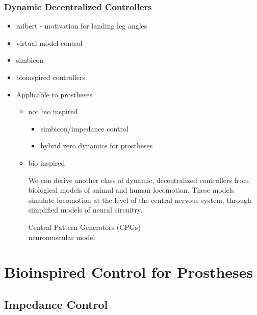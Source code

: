 \subsubsection{Dynamic Decentralized Controllers}
    \begin{itemize}
        \item raibert - motivation for landing leg angles
        \item virtual model control
        \item simbicon
        \item bioinspired controllers

        \item Applicable to prostheses
        \begin{itemize}
            \item not bio inspired
                \begin{itemize}
                    \item simbicon/impedance control
                    \item hybrid zero dynamics for prostheses
                \end{itemize}

            \item bio inspired

                We can derive another class of dynamic, decentralized
                controllers from biological models of animal and human
                locomotion. These models simulate locomotion at the level of the
                central nervous system, through simplified models of neural
                circuitry. 
                \begin{description}
                    \item[Central Pattern Generators (CPGs)]
                        
                    \item[neuromuscular model] 
                \end{description}
        \end{itemize}
   \end{itemize}

\section{Bioinspired Control for Prostheses}\label{sec:bioinspired_pros_control}
\subsection{Impedance Control}

